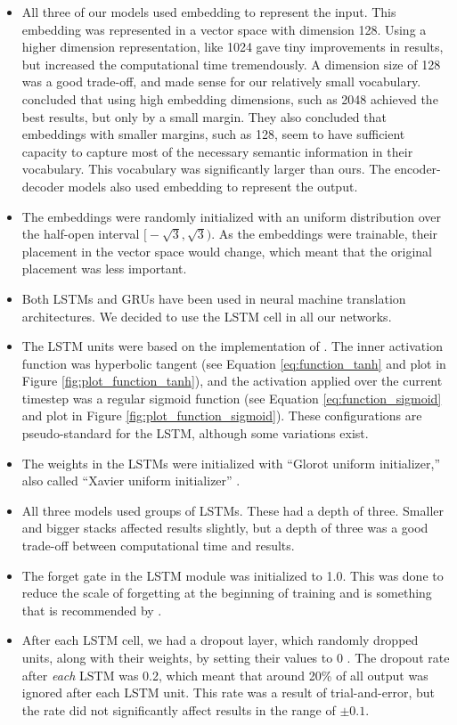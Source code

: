 \begin{itemize}
    \item All three of our models used embedding to represent the input. This embedding was represented in a vector space with dimension 128. Using a higher dimension representation, like 1024 gave tiny improvements in results, but increased the computational time tremendously. A dimension size of 128 was a good trade-off, and made sense for our relatively small vocabulary. \cite{britz2017massive} concluded that using high embedding dimensions, such as 2048 achieved the best results, but only by a small margin.  They also concluded that embeddings with smaller margins, such as 128, seem to have sufficient capacity to capture most of the necessary semantic information in their vocabulary. This vocabulary was significantly larger than ours. The encoder-decoder models also used embedding to represent the output.
    \item The embeddings were randomly initialized with an uniform distribution over the half-open interval \(\big[-\sqrt{3}, \sqrt{3}\big)\). As the embeddings were trainable, their placement in the vector space would change, which meant that the original placement was less important.
    \item Both LSTMs and GRUs have been used in neural machine translation architectures. We decided to use the LSTM cell in all our networks. 
    \item The LSTM units were based on the implementation of \cite{hochreiter1997long}. The inner activation function was hyperbolic tangent (see Equation \ref{eq:function_tanh} and plot in Figure \ref{fig:plot_function_tanh}), and the activation applied over the current timestep was a regular sigmoid function (see Equation \ref{eq:function_sigmoid} and plot in Figure \ref{fig:plot_function_sigmoid}). These configurations are pseudo-standard for the LSTM, although some variations exist.
    \item The weights in the LSTMs were initialized with ``Glorot uniform initializer,'' also called ``Xavier uniform initializer'' \citep{glorot2010understanding}.
    \item All three models used groups of LSTMs. These had a depth of three. Smaller and bigger stacks affected results slightly, but a depth of three was a good trade-off between computational time and results.
    \item The forget gate in the LSTM module was initialized to 1.0. This was done to reduce the scale of forgetting at the beginning of training and is something that is recommended by \cite{zaremba2015empirical}.
    \item After each LSTM cell, we had a dropout layer, which randomly dropped units, along with their weights, by setting their values to 0 \citep{srivastava2014dropout}. The dropout rate after \emph{each} LSTM was 0.2, which meant that around 20\% of all output was ignored after each LSTM unit. This rate was a result of trial-and-error, but the rate did not significantly affect results in the range of \(\pm 0.1\).
\end{itemize}

